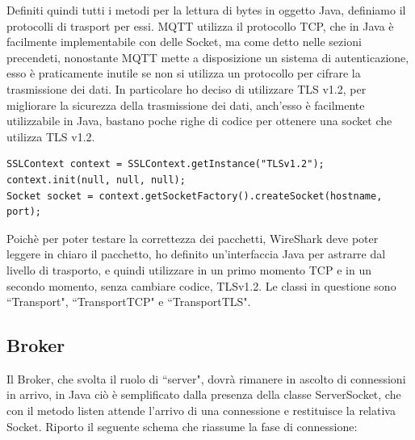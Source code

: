 \documentclass{article}
\begin{document}
Definiti quindi tutti i metodi per la lettura di bytes in oggetto Java, definiamo il protocolli di trasport per essi. MQTT utilizza il protocollo TCP, che in Java è facilmente implementabile con delle Socket, ma come detto nelle sezioni precendeti, nonostante MQTT mette a disposizione un sistema di autenticazione, esso è praticamente inutile se non si utilizza un protocollo per cifrare la trasmissione dei dati. In particolare ho deciso di utilizzare TLS v1.2, per migliorare la sicurezza della trasmissione dei dati, anch'esso è facilmente utilizzabile in Java, bastano poche righe di codice per ottenere una socket che utilizza TLS v1.2.
\begin{lstlisting}[style=JavaStyle]
SSLContext context = SSLContext.getInstance("TLSv1.2");
context.init(null, null, null);
Socket socket = context.getSocketFactory().createSocket(hostname, port);
\end{lstlisting} 
Poichè per poter testare la correttezza dei pacchetti, WireShark deve poter leggere in chiaro il pacchetto, ho definito un'interfaccia Java per astrarre dal livello di trasporto, e quindi utilizzare in un primo momento TCP e in un secondo momento, senza cambiare codice, TLSv1.2. Le classi in questione sono ``Transport", ``TransportTCP" e ``TransportTLS".

\subsection{Broker}
Il Broker, che svolta il ruolo di ``server", dovrà rimanere in ascolto di connessioni in arrivo, in Java ciò è semplificato dalla presenza della classe ServerSocket, che con il metodo listen attende l'arrivo di una connessione e restituisce la relativa Socket. Riporto il seguente schema che riassume la fase di connessione:
\end{document}
